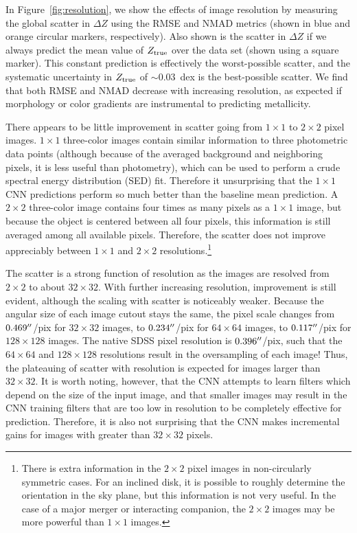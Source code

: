 \documentclass[fleqn,usenatbib]{mnras}
\begin{document}
In Figure~\ref{fig:resolution}, we show the effects of image resolution by measuring the global scatter in $\Delta Z$ using the RMSE and NMAD metrics (shown in blue and orange circular markers, respectively).
Also shown is the scatter in $\Delta Z$ if we always predict the mean value of $Z_{\rm true}$ over the data set (shown using a square marker).
This constant prediction is effectively the worst-possible scatter, and the \cite{2004ApJ...613..898T} systematic uncertainty in $Z_{\rm true}$ of $\sim 0.03$~dex is the best-possible scatter.
We find that both RMSE and NMAD decrease with increasing resolution, as expected if morphology or color gradients are instrumental to predicting metallicity.


There appears to be little improvement in scatter going from $1 \times 1$ to $2\times 2$ pixel images.
$1\times 1$ three-color images contain similar information to three photometric data points (although because of the averaged background and neighboring pixels, it is less useful than photometry), which can be used to perform a crude spectral energy distribution (SED) fit.
Therefore it unsurprising that the $1 \times 1$ CNN predictions perform so much better than the baseline mean prediction.
A $2 \times 2$ three-color image contains four times as many pixels as a $1\times 1$ image, but because the object is centered between all four pixels, this information is still averaged among all available pixels.
Therefore, the scatter does not improve appreciably between $1 \times 1$ and $2 \times 2$ resolutions.\footnote{There is extra information in the $2\times 2$ pixel images in non-circularly symmetric cases. For an inclined disk, it is possible to roughly determine the orientation in the sky plane, but this information is not very useful. In the case of a major merger or interacting companion, the $2\times 2$ images may be more powerful than $1 \times 1$ images.}

The scatter is a strong function of resolution as the images are resolved from $2 \times 2$ to about $32 \times 32$.
With further increasing resolution, improvement is still evident, although the scaling with scatter is noticeably weaker.
Because the angular size of each image cutout stays the same, the pixel scale changes from $0.469\hbox{$^{\prime\prime}$}$/pix for $32 \times 32$ images, to $0.234\hbox{$^{\prime\prime}$}$/pix for $64 \times 64$ images, to $0.117\hbox{$^{\prime\prime}$}$/pix for $128 \times 128$ images.
The native SDSS pixel resolution is $0.396\hbox{$^{\prime\prime}$}$/pix, such that the $64 \times 64$ and $128 \times 128$ resolutions result in the oversampling of each image!
Thus, the plateauing of scatter with resolution is expected for images larger than $32 \times 32$.
It is worth noting, however, that the CNN attempts to learn filters which depend on the size of the input image, and that smaller images may result in the CNN training filters that are too low in resolution to be completely effective for prediction.
Therefore, it is also not surprising that the CNN makes incremental gains for images with greater than $32 \times 32$ pixels.
\end{document}
